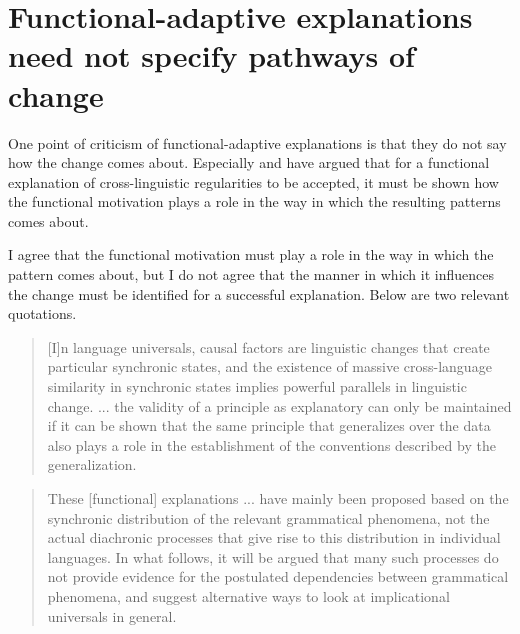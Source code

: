 \documentclass[output=paper]{langsci/langscibook}
\begin{document}
\section{Functional-adaptive explanations need not specify pathways of change}\label{sec:haspelmath:6}

One point of criticism of functional-adaptive explanations is that they do not say how the change comes about. Especially  and  have argued that for a functional explanation of cross-linguistic regularities to be accepted, it must be shown how the functional motivation plays a role in the way in which the resulting patterns comes about.

I agree that the functional motivation must play a role in the way in which the pattern comes about, but I do not agree that the manner in which it influences the change must be identified for a successful explanation. Below are two relevant quotations.

\begin{quote}
[I]n language universals, causal factors are linguistic changes that create particular synchronic states, and the existence of massive cross-language similarity in synchronic states implies powerful parallels in linguistic change. ... the validity of a principle as explanatory can only be maintained if it can be shown that the same principle that generalizes over the data also plays a role in the establishment of the conventions described by the generalization. \citep[352]{Bybee1988}
\end{quote}

\begin{quote}
These [functional] explanations ... have mainly been proposed based on the synchronic distribution of the relevant grammatical phenomena, not the actual diachronic processes that give rise to this distribution in individual languages. In what follows, it will be argued that many such processes do not provide evidence for the postulated dependencies between grammatical phenomena, and suggest alternative ways to look at implicational universals in general. \citep[10]{Cristofaro2017}
\end{quote}
\end{document}
